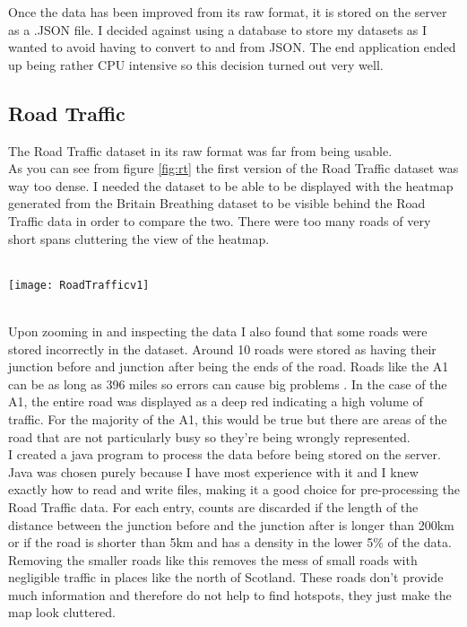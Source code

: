 Once the data has been improved from its raw format, it is stored on the server as a .JSON file. I decided against using a database to store my datasets as I wanted to avoid having to convert to and from JSON. The end application ended up being rather CPU intensive so this decision turned out very well.

\subsection{Road Traffic}

The Road Traffic dataset in its raw format was far from being usable.\\

As you can see from figure \ref{fig:rt} the first version of the Road Traffic dataset was way too dense. I needed the dataset to be able to be displayed with the heatmap generated from the Britain Breathing dataset to be visible behind the Road Traffic data in order to compare the two. There were too many roads of very short spans cluttering the view of the heatmap.\\

\begin{SCfigure}
\label{fig:rt}
\caption{Figure \ref{fig:rt} : First attempt at displaying the Road Traffic data}\\
\centering
\texttt{[image: RoadTrafficv1]}
\centering
\end{SCfigure}\\

Upon zooming in and inspecting the data I also found that some roads were stored incorrectly in the dataset. Around 10 roads were stored as having their junction before and junction after being the ends of the road. Roads like the A1 can be as long as 396 miles so errors can cause big problems \cite{longestRoad}. In the case of the A1, the entire road was displayed as a deep red indicating a high volume of traffic. For the majority of the A1, this would be true but there are areas of the road that are not particularly busy so they're being wrongly represented. \\

I created a java program to process the data before being stored on the server. Java was chosen purely because I have most experience with it and I knew exactly how to read and write files, making it a good choice for pre-processing the Road Traffic data. For each entry, counts are discarded if the length of the distance between the junction before and the junction after is longer than 200km or if the road is shorter than 5km and has a density in the lower 5\% of the data. Removing the smaller roads like this removes the mess of small roads with negligible traffic in places like the north of Scotland. These roads don't provide much information and therefore do not help to find hotspots, they just make the map look cluttered.\\

